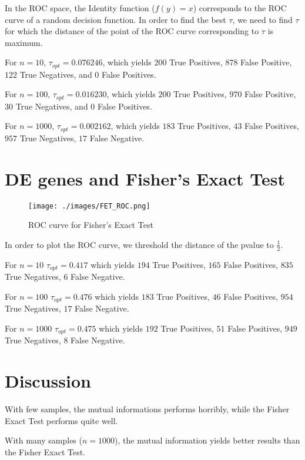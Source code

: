 \documentclass{article}
\begin{document}
In the ROC space, the Identity function ($f(y) = x$) corresponds to the ROC
curve of a random decision function. In order to find the best $\tau$, we need
to find $\tau$ for which the distance of the point of the ROC curve
corresponding to $\tau$ is maximum.

For $n=10$, $\tau_{opt} = 0.076246$, which yields $200$ True Positives, $878$
False Positive, $122$ True Negatives, and $0$ False Positives.

For $n=100$, $\tau_{opt} = 0.016230$, which yields $200$ True Positives, $970$
False Positive, $30$ True Negatives, and $0$ False Positives.

For $n = 1000$, $\tau_{opt} = 0.002162$, which yields $183$ True Positives, $43$
False Positives, $957$ True Negatives, $17$ False Negative.


\section{DE genes and Fisher's Exact Test}
\begin{figure}
\begin{center}
\texttt{[image: ./images/FET\_ROC.png]}
\end{center}
\caption{ROC curve for Fisher's Exact Test}
\end{figure}

In order to plot the ROC curve, we threshold the distance of the pvalue to
$\frac{1}{2}$.

For $n=10$ $\tau_{opt} = 0.417$ which yields $194$ True Positives, $165$
False Positives, $835$ True Negatives, $6$ False Negative.

For $n=100$ $\tau_{opt} = 0.476$ which yields $183$ True Positives, $46$
False Positives, $954$ True Negatives, $17$ False Negative.

For $n=1000$ $\tau_{opt} = 0.475$ which yields $192$ True Positives, $51$
False Positives, $949$ True Negatives, $8$ False Negative.

\section{Discussion}
With few samples, the mutual informations performs horribly, while the Fisher
Exact Test performs quite well.

With many samples ($n=1000$), the mutual information yields better results
than the Fisher Exact Test.
\end{document}
